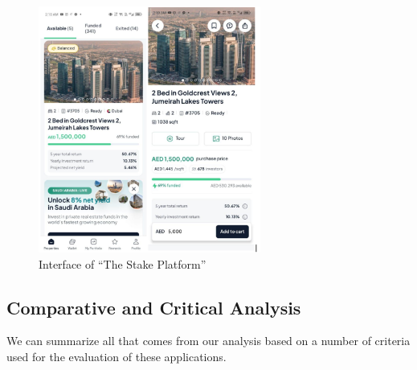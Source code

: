 \newpage
\thispagestyle{empty}
\newpage

\begin{figure}[htbp]
    \centering
    \includegraphics[width=0.65\textwidth]{images/Interface-of-the Stake Platform.png}
    \caption{Interface of ``The Stake Platform''}
    \label{fig:stake-platform}
\end{figure}

\subsection{Comparative and Critical Analysis}

We can summarize all that comes from our analysis based on a number of criteria used for the evaluation of these applications.

